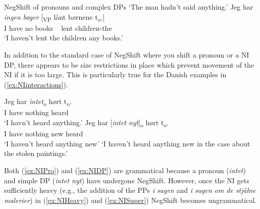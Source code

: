 \documentclass[12pt, letterpaper]{article}
\begin{document}
\ea NegShift of pronouns and complex DPs\label{ex:PRIMARepeat}
     
    \glt `The man hadn't said anything.'
    \ex 
    \gll Jeg har \textit{ingen} \textit{bøger} [\textsubscript{VP} lånt børnene t\textsubscript{o}.]\\
    I have no books ~ lent children-the\\
    \glt `I haven't lent the children any books.'
    \z
\z 

In addition to the standard case of NegShift where you shift a pronoun or a NI DP, there appears to be size restrictions in place which prevent movement of the NI if it is too large. This is particularly true for the Danish examples in (\ref{ex:NIinteractions}). 

\ea\label{ex:NIinteractions}
	\ea
	{{\gll Jeg har \textit{intet}\textsubscript{o} hørt t\textsubscript{o}.\\
	I have nothing heard\\}}
	\glt  `I havn't heard anything.'\label{ex:NIPro}
	\ex 
	\gll Jeg har [\textit{intet} \textit{nyt}]\textsubscript{o} hørt t\textsubscript{o}.\\
	I have nothing new heard\\
	\glt `I haven't heard anything new'\label{ex:NIDP}
	\glt `I haven't heard anything new in the case about the stolen paintings.'\label{ex:NISuper}
	\z 
\z

Both (\ref{ex:NIPro}) and (\ref{ex:NIDP}) are grammatical because a pronoun (\emph{intet}) and simple DP (\emph{intet nyt}) have undergone NegShift. However, once the NI gets sufficiently heavy (e.g., the addition of the PPs \emph{i sagen} and \emph{i sagen om de stjålne malerier}) in (\ref{ex:NIHeavy}) and (\ref{ex:NISuper}) NegShift becomes ungrammatical. 
\end{document}
